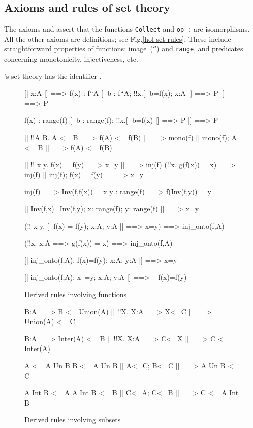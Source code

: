 \subsection{Axioms and rules of set theory}
The axioms  and
 assert that the functions {\tt Collect} and
\hbox{\tt op :} are isomorphisms. 
All the other axioms are definitions; see Fig.\ts \ref{hol-set-rules}.
These include straightforward properties of functions: image~({\tt``}) and
{\tt range}, and predicates concerning monotonicity, injectiveness, etc.

\HOL's set theory has the {\ML} identifier .

\begin{figure} \underscoreon
\begin{ttbox}
     [| x:A |] ==> f(x) : f``A
     [| b : f``A;  !!x.[| b=f(x);  x:A |] ==> P |] ==> P

     f(x) : range(f)
     [| b : range(f);  !!x.[| b=f(x) |] ==> P |] ==> P

      [| !!A B. A <= B ==> f(A) <= f(B) |] ==> mono(f)
      [| mono(f);  A <= B |] ==> f(A) <= f(B)

       [| !! x y. f(x) = f(y) ==> x=y |] ==> inj(f)
              (!!x. g(f(x)) = x) ==> inj(f)
       [| inj(f); f(x) = f(y) |] ==> x=y

    inj(f) ==> Inv(f,f(x)) = x
    y : range(f) ==> f(Inv(f,y)) = y

    [| Inv(f,x)=Inv(f,y); x: range(f);  y: range(f) |] ==> x=y

    (!! x y. [| f(x) = f(y); x:A; y:A |] ==> x=y) ==> inj_onto(f,A)

    (!!x. x:A ==> g(f(x)) = x) ==> inj_onto(f,A)

    [| inj_onto(f,A);  f(x)=f(y);  x:A;  y:A |] ==> x=y

    [| inj_onto(f,A);  x~=y;  x:A;  y:A |] ==> ~ f(x)=f(y)
\end{ttbox}
\caption{Derived rules involving functions} \label{hol-fun}
\end{figure}


\begin{figure} \underscoreon
\begin{ttbox}
     B:A ==> B <= Union(A)
     [| !!X. X:A ==> X<=C |] ==> Union(A) <= C

     B:A ==> Inter(A) <= B
  [| !!X. X:A ==> C<=X |] ==> C <= Inter(A)

       A <= A Un B
       B <= A Un B
        [| A<=C;  B<=C |] ==> A Un B <= C

      A Int B <= A
      A Int B <= B
    [| C<=A;  C<=B |] ==> C <= A Int B
\end{ttbox}
\caption{Derived rules involving subsets} \label{hol-subset}
\end{figure}


